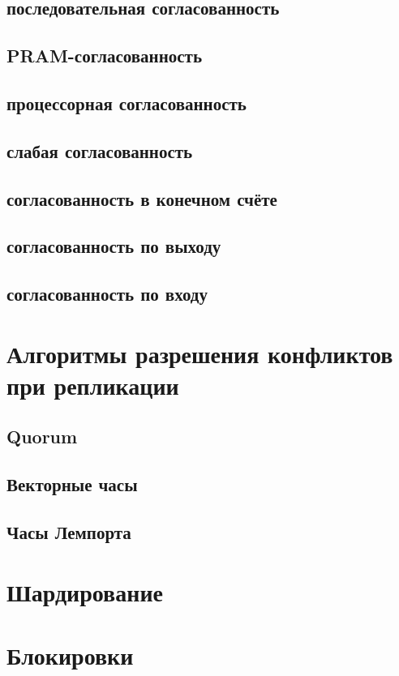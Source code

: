 \subsection{последовательная согласованность}
\subsection{PRAM-согласованность}
\subsection{процессорная согласованность}
\subsection{слабая согласованность }
\subsection{согласованность в конечном счёте}
\subsection{согласованность по выходу}
\subsection{согласованность по входу}

\section{Алгоритмы разрешения конфликтов при репликации}
\subsection{Quorum}
\subsection{Векторные часы}
\subsection{Часы Лемпорта}

\section{Шардирование}
\section{Блокировки}

